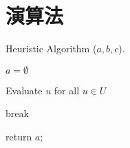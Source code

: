 \chapter{演算法}\label{algorithm}

\begin{algorithm}
    \caption{ Heuristic Algorithm ($a,b,c$).}
    \label{alg:main}
    \begin{algorithmic}[1]

    \State $a = \emptyset$

        \State Evaluate $u$ for all $u \in U$



            \State break

        \EndIf

    \EndWhile
    \State return $a$;

    \end{algorithmic}
\end{algorithm}